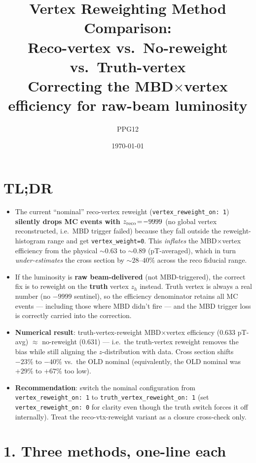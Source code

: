 \documentclass[11pt,a4paper]{article}
\title{Vertex Reweighting Method Comparison:\\Reco-vertex vs.\ No-reweight vs.\ Truth-vertex\\[-2pt]\large Correcting the MBD$\times$vertex efficiency for raw-beam luminosity}
\author{PPG12}
\date{\today}
\begin{document}
\maketitle
\vspace{-1.5em}

\section*{TL;DR}

\begin{itemize}
\item The current ``nominal'' reco-vertex reweight (\texttt{vertex\_reweight\_on: 1}) \textbf{silently drops MC events with $z_{\rm reco}\!=\!-9999$} (no global vertex reconstructed, i.e.\ MBD trigger failed) because they fall outside the reweight-histogram range and get \texttt{vertex\_weight=0}. This \emph{inflates} the MBD$\times$vertex efficiency from the physical $\sim 0.63$ to $\sim 0.89$ (pT-averaged), which in turn \emph{under-estimates} the cross section by $\sim 28$--$40\%$ across the reco fiducial range.
\item If the luminosity is \textbf{raw beam-delivered} (not MBD-triggered), the correct fix is to reweight on the \textbf{truth} vertex $z_h$ instead. Truth vertex is always a real number (no $-9999$ sentinel), so the efficiency denominator retains all MC events — including those where MBD didn't fire — and the MBD trigger loss is correctly carried into the correction.
\item \textbf{Numerical result}: truth-vertex-reweight MBD$\times$vertex efficiency (0.633 pT-avg) $\approx$ no-reweight (0.631) — i.e.\ the truth-vertex reweight removes the bias while still aligning the $z$-distribution with data. Cross section shifts $-23\%$ to $-40\%$ vs.\ the OLD nominal (equivalently, the OLD nominal was $+29\%$ to $+67\%$ too low).
\item \textbf{Recommendation}: switch the nominal configuration from \texttt{vertex\_reweight\_on: 1} to \texttt{truth\_vertex\_reweight\_on: 1} (set \texttt{vertex\_reweight\_on: 0} for clarity even though the truth switch forces it off internally). Treat the reco-vtx-reweight variant as a closure cross-check only.
\end{itemize}

\section*{1. Three methods, one-line each}
\end{document}
